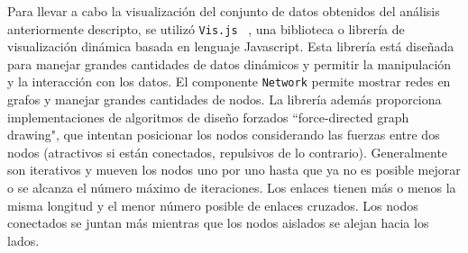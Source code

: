 Para llevar a cabo la visualización del conjunto de datos obtenidos del análisis anteriormente descripto, se utilizó \texttt{Vis.js} ~\cite{visjsPaginaWeb}, una biblioteca o librería de visualización dinámica basada en lenguaje Javascript. Esta librería está diseñada para manejar grandes cantidades de datos dinámicos y permitir la manipulación y la interacción con los datos. El componente \texttt{Network} permite mostrar redes en grafos y manejar grandes cantidades de nodos. 
La librería además proporciona implementaciones de algoritmos de diseño forzados ``force-directed graph drawing", que intentan posicionar los nodos considerando las fuerzas entre dos nodos (atractivos si están conectados, repulsivos de lo contrario). Generalmente son iterativos y mueven los nodos uno por uno hasta que ya no es posible mejorar o se alcanza el número máximo de iteraciones. Los enlaces tienen más o menos la misma longitud y el menor número posible de enlaces cruzados. Los nodos conectados se juntan más mientras que los nodos aislados se alejan hacia los lados.
